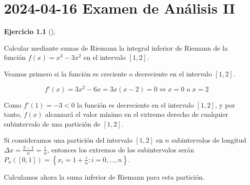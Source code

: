 \documentclass[
  spanish,
  a4paper,
]{scrreport}
\theoremstyle{definition}
\newtheorem{exercise}{Ejercicio}[chapter]
\theoremstyle{remark}
\begin{document}

\chapter{\texorpdfstring{2024-04-16 Examen de Análisis
II}{2024-04-16  Examen de Análisis II}}\label{examen-de-anuxe1lisis-ii-2}

\begin{exercise}[]\protect\hypertarget{exr-1}{}\label{exr-1}

Calcular mediante sumas de Riemann la integral inferior de Riemann de la
función \(f(x) = x^3-3x^2\) en el intervalo \([1, 2]\).

\end{exercise}

\begin{tcolorbox}[enhanced jigsaw, arc=.35mm, bottomrule=.15mm, bottomtitle=1mm, breakable, colback=white, colbacktitle=quarto-callout-tip-color!10!white, colframe=quarto-callout-tip-color-frame, coltitle=black, left=2mm, leftrule=.75mm, opacityback=0, opacitybacktitle=0.6, rightrule=.15mm, title=\textcolor{quarto-callout-tip-color}{\faLightbulb}\hspace{0.5em}{Solución}, titlerule=0mm, toprule=.15mm, toptitle=1mm]

Veamos primero si la función es creciente o decreciente en el intervalo
\([1, 2]\).

\[
f'(x) = 3x^2-6x = 3x(x-2) = 0 \Leftrightarrow x=0 \mbox{ o } x=2
\]

Como \(f'(1) = -3 < 0\) la función es decreciente en el intervalo
\([1, 2]\), y por tanto, \(f(x)\) alcanzará el valor mínimo en el
extremo derecho de cualquier subintervalo de una partición de
\([1, 2]\).

Si consideramos una partición del intervalo \([1, 2]\) en \(n\)
subintervalos de longitud \(\Delta x = \frac{2-1}{n} = \frac{1}{n}\),
entonces los extremos de los subintervalos serán
\(P_n([0,1]) = \left\{x_i = 1 + \frac{i}{n}: i = 0, \ldots, n\right\}\).

Calculamos ahora la suma inferior de Riemann para esta partición.


\end{tcolorbox}
\end{document}
